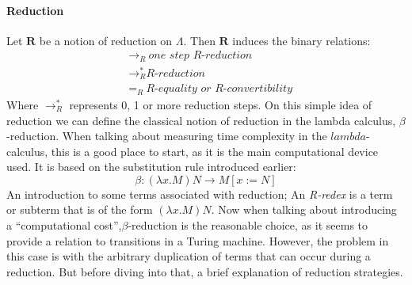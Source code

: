 \documentclass[12pt]{article}
\begin{document}
\paragraph{Reduction} Let $\textbf{R}$ be a notion of reduction on $\Lambda$. Then $\textbf{R}$ induces the binary relations:
\begin{equation}
  \begin{split}
          &{\rightarrow}_{R} \ \textit{one step R-reduction} \\
          &\rightarrow_{R}^{*} \textit{R-reduction} \\
          &=_{R} \ \textit{R-equality or R-convertibility}
  \end{split}
\end{equation}
Where $\rightarrow_{R}^{*}$ represents 0, 1 or more reduction steps.
On this simple idea of reduction we can define the classical notion of reduction in the lambda calculus, $\beta$-reduction. When talking about measuring time complexity in the $lambda$-calculus, this is a good place to start, as it is the main computational device used.
It is based on the substitution rule introduced earlier:
\begin{equation}
  \beta : ( \lambda x.M ) N \rightarrow M [ x:=N ]
\end{equation}
An introduction to some terms associated with reduction; An \textit{R-redex} is a term or subterm that is of the form $(\lambda x . M)N$.
Now when talking about introducing a \enquote{computational cost},$\beta$-reduction is the reasonable choice, as it seems to provide a relation to transitions in a Turing machine. However, the problem in this case is with the arbitrary duplication of terms that can occur during a reduction.
But before diving into that, a brief explanation of reduction strategies.
\end{document}
